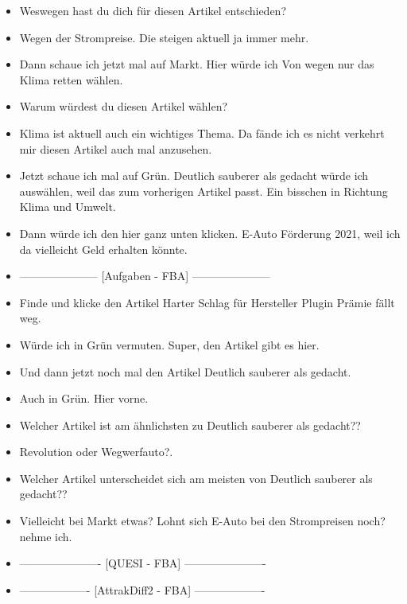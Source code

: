 {\begin{itemize}[]
        \item {} Weswegen hast du dich für diesen Artikel entschieden?
        \item {} Wegen der Strompreise. Die steigen aktuell ja immer mehr.
        \item {} Dann schaue ich jetzt mal auf Markt.
              Hier würde ich \flqq Von wegen nur das Klima retten\frqq{} wählen.
        \item {} Warum würdest du diesen Artikel wählen?
        \item {} Klima ist aktuell auch ein wichtiges Thema. Da fände ich es nicht verkehrt mir diesen Artikel auch mal anzusehen.
        \item {} Jetzt schaue ich mal auf Grün.
              \flqq Deutlich sauberer als gedacht\frqq{} würde ich auswählen, weil das zum vorherigen Artikel passt.
              Ein bisschen in Richtung Klima und Umwelt.
        \item {} Dann würde ich den hier ganz unten klicken. \flqq E-Auto Förderung 2021\frqq{}, weil ich da vielleicht Geld erhalten könnte.
        \item {---------------------} [Aufgaben - FBA] {---------------------}
        \item {} Finde und klicke den Artikel \flqq Harter Schlag für Hersteller Plugin Prämie fällt weg\frqq{}.
        \item {} Würde ich in Grün vermuten. Super, den Artikel gibt es hier.
        \item {} Und dann jetzt noch mal den Artikel \flqq Deutlich sauberer als gedacht\frqq{}.
        \item {} Auch in Grün. Hier vorne.
        \item {} Welcher Artikel ist am ähnlichsten zu \flqq Deutlich sauberer als gedacht?\frqq{}?
        \item {} \flqq Revolution oder Wegwerfauto?\frqq{}.
        \item {} Welcher Artikel unterscheidet sich am meisten von \flqq Deutlich sauberer als gedacht?\frqq{}?
        \item {} Vielleicht bei Markt etwas?
              \flqq Lohnt sich E-Auto bei den Strompreisen noch?\frqq{} nehme ich.
        \item {----------------------} [QUESI - FBA] {----------------------}
        \item {-------------------} [AttrakDiff2 - FBA] {-------------------}

\end{itemize}}
